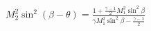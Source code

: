 \documentclass[10pt]{article}
\begin{document}
\begin{align*}M_{2}^{2} \sin^{2} \left( \beta-\theta \right)
=
\frac{
1 + \frac{\gamma-1}{2} M_{1}^{2} \sin^2 \beta
}
{
\gamma M_{1}^{2} \sin^2 \beta - \frac{\gamma-1}{2}
}\end{align*}
\end{document}
